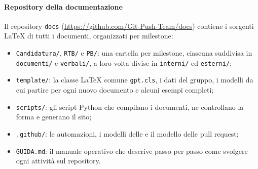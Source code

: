 \documentclass[documento]{gpt}
\begin{document}
	\paragraph{Repository della documentazione}
	Il repository \texttt{docs} (\url{https://github.com/Git-Push-Team/docs})
	contiene i sorgenti \LaTeX{} di tutti i documenti, organizzati per milestone:
	\begin{itemize}
		\item \texttt{Candidatura/}, \texttt{RTB/} e \texttt{PB/}: una cartella per
		milestone, ciascuna suddivisa in \texttt{documenti/} e
		\texttt{verbali/}, a loro volta divise in \texttt{interni/} ed
		\texttt{esterni/};
		\item \texttt{template/}: la classe \LaTeX{} comune \texttt{gpt.cls}, i dati
		del gruppo, i modelli da cui partire per ogni nuovo documento e alcuni
		esempi completi;
		\item \texttt{scripts/}: gli script Python che compilano i documenti, ne
		controllano la forma e generano il sito;
		\item \texttt{.github/}: le automazioni, i modelli delle  e il
		modello delle pull request;
		\item \texttt{GUIDA.md}: il manuale operativo che descrive passo per passo
		come svolgere ogni attività sul repository.
	\end{itemize}
	
\end{document}
